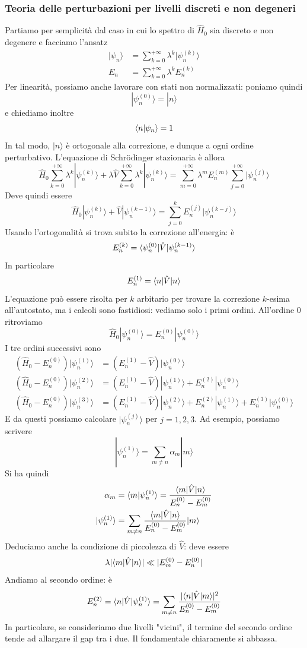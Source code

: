 \documentclass[a4paper, 11pt]{article}
\newcommand{\op}[1]{\hat{#1}}
\renewcommand{\op}[1]{\hat{#1}}
\newcommand{\ham}{\hat{H}}
\renewcommand{\ket}[1]{| #1\rangle}
\begin{document}
\subsubsection{Teoria delle perturbazioni per livelli discreti e non degeneri}
Partiamo per semplicità dal caso in cui lo spettro di $\ham_0$ sia discreto e non degenere e facciamo l'ansatz
\begin{align*}\ket{\psi_n}&=\sum_{k=0}^{+\infty}\lambda^k\ket{\psi_n^{(k)}}\\E_n&=\sum_{k=0}^{+\infty}\lambda^kE_n^{(k)}\end{align*}
Per linearità, possiamo anche lavorare con stati non normalizzati: poniamo quindi
\[\ket{\psi_n^{(0)}}=\ket{n}\]
e chiediamo inoltre
\[\langle n\vert\psi_n\rangle=1\]
In tal modo, $\ket{n}$ è ortogonale alla correzione, e dunque a ogni ordine perturbativo. L'equazione di Schr\"odinger stazionaria è allora 
\[\ham_0\sum_{k=0}^{+\infty}\lambda^k\ket{\psi_n^{(k)}}+\lambda\op V\sum_{k=0}^{+\infty}\lambda^k\ket{\psi_n^{(k)}}=\sum_{m=0}^{+\infty}\lambda^mE_n^{(m)}\sum_{j=0}^{+\infty}\ket{\psi_n^{(j)}}\]
Deve quindi essere
\[\ham_0\ket{\psi_n^{(k)}}+\op V\ket{\psi_n^{(k-1)}}=\sum_{j=0}^{k}E_n^{(j)}\ket{\psi_n^{(k-j)}}\]
Usando l'ortogonalità si trova subito la correzione all'energia: è
\[E_n^{(k)}=\braketop{\psi_n^{(0)}}{\op V}{\psi_n^{(k-1)}}\]
In particolare
\[E_n^{(1)}=\braketop{n}{\op V}{n}\]
L'equazione può essere risolta per $k$ arbitario per trovare la correzione $k$-esima all'autostato, ma i calcoli sono fastidiosi: vediamo solo i primi ordini. All'ordine 0 ritroviamo
\[\ham_0\ket{\psi_n^{(0)}}=E_n^{(0)}\ket{\psi_n^{(0)}}\]
I tre ordini successivi sono
\begin{align*}
	(\ham_0-E_n^{(0)})\ket{\psi_n^{(1)}}&=(E_n^{(1)}-\op V)\ket{\psi_n^{(0)}}\\(\ham_0-E_n^{(0)})\ket{\psi_n^{(2)}}&=(E_n^{(1)}-\op V)\ket{\psi_n^{(1)}}+E_n^{(2)}\ket{\psi_n^{(0)}}\\(\ham_0-E_n^{(0)})\ket{\psi_n^{(3)}}&=(E_n^{(1)}-\op V)\ket{\psi_n^{(2)}}+E_n^{(2)}\ket{\psi_n^{(1)}}+E_n^{(3)}\ket{\psi_n^{(0)}}
\end{align*}
E da questi possiamo calcolare $\ket{\psi_n^{(j)}}$ per $j=1,2,3$. Ad esempio, possiamo scrivere
\[\ket{\psi_n^{(1)}}=\sum_{m\neq n}\alpha_m\ket{m}\]
Si ha quindi
\begin{align*}\alpha_m&=\braket{m}{\psi_n^{(1)}}=\frac{\braketop{m}{\op V}{n}}{E_n^{(0)}-E_m^{(0)}}\\\ket{\psi_n^{(1)}}&=\sum_{m\neq n}\frac{\braketop{m}{\op V}{n}}{E_n^{(0)}-E_m^{(0)}}\ket {m}\end{align*}
Deduciamo anche la condizione di piccolezza di $\hat{V}$: deve essere 
\[\lambda|\braketop{m}{\op V}{n}|\ll|E_m^{(0)}-E_n^{(0)}|\]
Andiamo al secondo ordine: è
\[E_n^{(2)}=\braketop{n}{\op V}{\psi_n^{(1)}}=\sum_{m\neq n}\frac{|\braketop{n}{\op V}{m}|^2}{E_n^{(0)}-E_m^{(0)}}\]
In particolare, se consideriamo due livelli "vicini", il termine del secondo ordine tende ad allargare il gap tra i due. Il fondamentale chiaramente si abbassa.
\end{document}
